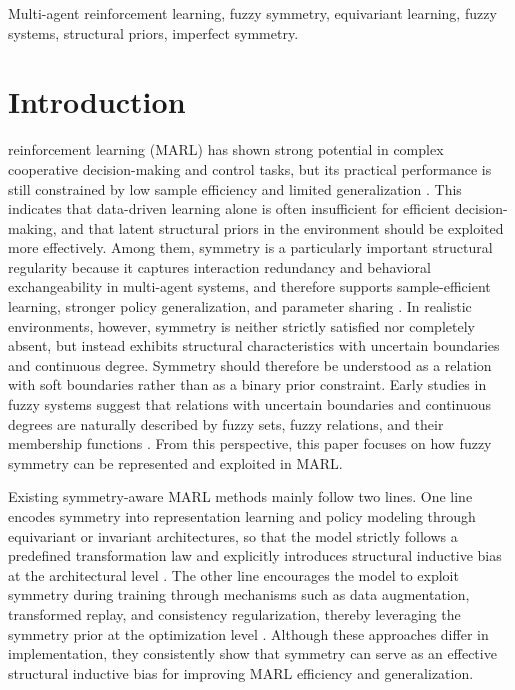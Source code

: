 \documentclass[lettersize,journal]{IEEEtran}
\begin{document}
\begin{IEEEkeywords}
Multi-agent reinforcement learning, fuzzy symmetry, equivariant learning, fuzzy systems, structural priors, imperfect symmetry.
\end{IEEEkeywords}

\section{Introduction}
 reinforcement learning (MARL) has shown strong potential in complex cooperative decision-making and control tasks, but its practical performance is still constrained by low sample efficiency and limited generalization \cite{boutilier1996,lowe2017,rashid2018,yu2021ppo}. This indicates that data-driven learning alone is often insufficient for efficient decision-making, and that latent structural priors in the environment should be exploited more effectively. Among them, symmetry is a particularly important structural regularity because it captures interaction redundancy and behavioral exchangeability in multi-agent systems, and therefore supports sample-efficient learning, stronger policy generalization, and parameter sharing \cite{api2023,yu2023esp,vanderpol2021,wang2022}. In realistic environments, however, symmetry is neither strictly satisfied nor completely absent, but instead exhibits structural characteristics with uncertain boundaries and continuous degree. Symmetry should therefore be understood as a relation with soft boundaries rather than as a binary prior constraint. Early studies in fuzzy systems suggest that relations with uncertain boundaries and continuous degrees are naturally described by fuzzy sets, fuzzy relations, and their membership functions \cite{zadeh1965,wangbook}. From this perspective, this paper focuses on how fuzzy symmetry can be represented and exploited in MARL.

Existing symmetry-aware MARL methods mainly follow two lines. One line encodes symmetry into representation learning and policy modeling through equivariant or invariant architectures, so that the model strictly follows a predefined transformation law and explicitly introduces structural inductive bias at the architectural level \cite{vanderpol2020,vanderpol2021,wang2022}. The other line encourages the model to exploit symmetry during training through mechanisms such as data augmentation, transformed replay, and consistency regularization, thereby leveraging the symmetry prior at the optimization level \cite{api2023,yu2023esp}. Although these approaches differ in implementation, they consistently show that symmetry can serve as an effective structural inductive bias for improving MARL efficiency and generalization.
\end{document}
